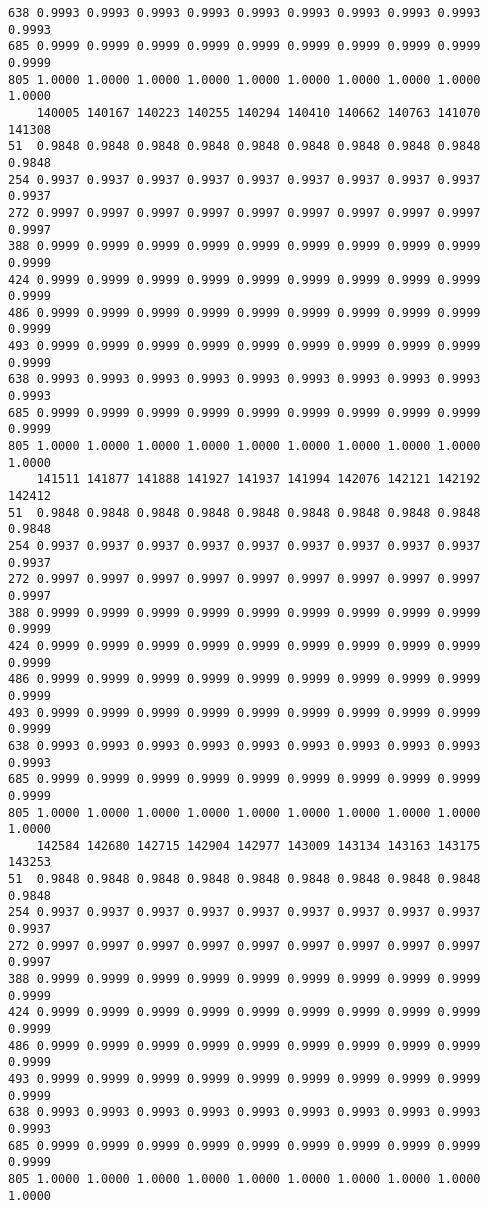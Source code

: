 \documentclass[
]{report}
\begin{document}
\begin{verbatim}
638 0.9993 0.9993 0.9993 0.9993 0.9993 0.9993 0.9993 0.9993 0.9993 0.9993
685 0.9999 0.9999 0.9999 0.9999 0.9999 0.9999 0.9999 0.9999 0.9999 0.9999
805 1.0000 1.0000 1.0000 1.0000 1.0000 1.0000 1.0000 1.0000 1.0000 1.0000
    140005 140167 140223 140255 140294 140410 140662 140763 141070 141308
51  0.9848 0.9848 0.9848 0.9848 0.9848 0.9848 0.9848 0.9848 0.9848 0.9848
254 0.9937 0.9937 0.9937 0.9937 0.9937 0.9937 0.9937 0.9937 0.9937 0.9937
272 0.9997 0.9997 0.9997 0.9997 0.9997 0.9997 0.9997 0.9997 0.9997 0.9997
388 0.9999 0.9999 0.9999 0.9999 0.9999 0.9999 0.9999 0.9999 0.9999 0.9999
424 0.9999 0.9999 0.9999 0.9999 0.9999 0.9999 0.9999 0.9999 0.9999 0.9999
486 0.9999 0.9999 0.9999 0.9999 0.9999 0.9999 0.9999 0.9999 0.9999 0.9999
493 0.9999 0.9999 0.9999 0.9999 0.9999 0.9999 0.9999 0.9999 0.9999 0.9999
638 0.9993 0.9993 0.9993 0.9993 0.9993 0.9993 0.9993 0.9993 0.9993 0.9993
685 0.9999 0.9999 0.9999 0.9999 0.9999 0.9999 0.9999 0.9999 0.9999 0.9999
805 1.0000 1.0000 1.0000 1.0000 1.0000 1.0000 1.0000 1.0000 1.0000 1.0000
    141511 141877 141888 141927 141937 141994 142076 142121 142192 142412
51  0.9848 0.9848 0.9848 0.9848 0.9848 0.9848 0.9848 0.9848 0.9848 0.9848
254 0.9937 0.9937 0.9937 0.9937 0.9937 0.9937 0.9937 0.9937 0.9937 0.9937
272 0.9997 0.9997 0.9997 0.9997 0.9997 0.9997 0.9997 0.9997 0.9997 0.9997
388 0.9999 0.9999 0.9999 0.9999 0.9999 0.9999 0.9999 0.9999 0.9999 0.9999
424 0.9999 0.9999 0.9999 0.9999 0.9999 0.9999 0.9999 0.9999 0.9999 0.9999
486 0.9999 0.9999 0.9999 0.9999 0.9999 0.9999 0.9999 0.9999 0.9999 0.9999
493 0.9999 0.9999 0.9999 0.9999 0.9999 0.9999 0.9999 0.9999 0.9999 0.9999
638 0.9993 0.9993 0.9993 0.9993 0.9993 0.9993 0.9993 0.9993 0.9993 0.9993
685 0.9999 0.9999 0.9999 0.9999 0.9999 0.9999 0.9999 0.9999 0.9999 0.9999
805 1.0000 1.0000 1.0000 1.0000 1.0000 1.0000 1.0000 1.0000 1.0000 1.0000
    142584 142680 142715 142904 142977 143009 143134 143163 143175 143253
51  0.9848 0.9848 0.9848 0.9848 0.9848 0.9848 0.9848 0.9848 0.9848 0.9848
254 0.9937 0.9937 0.9937 0.9937 0.9937 0.9937 0.9937 0.9937 0.9937 0.9937
272 0.9997 0.9997 0.9997 0.9997 0.9997 0.9997 0.9997 0.9997 0.9997 0.9997
388 0.9999 0.9999 0.9999 0.9999 0.9999 0.9999 0.9999 0.9999 0.9999 0.9999
424 0.9999 0.9999 0.9999 0.9999 0.9999 0.9999 0.9999 0.9999 0.9999 0.9999
486 0.9999 0.9999 0.9999 0.9999 0.9999 0.9999 0.9999 0.9999 0.9999 0.9999
493 0.9999 0.9999 0.9999 0.9999 0.9999 0.9999 0.9999 0.9999 0.9999 0.9999
638 0.9993 0.9993 0.9993 0.9993 0.9993 0.9993 0.9993 0.9993 0.9993 0.9993
685 0.9999 0.9999 0.9999 0.9999 0.9999 0.9999 0.9999 0.9999 0.9999 0.9999
805 1.0000 1.0000 1.0000 1.0000 1.0000 1.0000 1.0000 1.0000 1.0000 1.0000

\end{verbatim}
\end{document}
